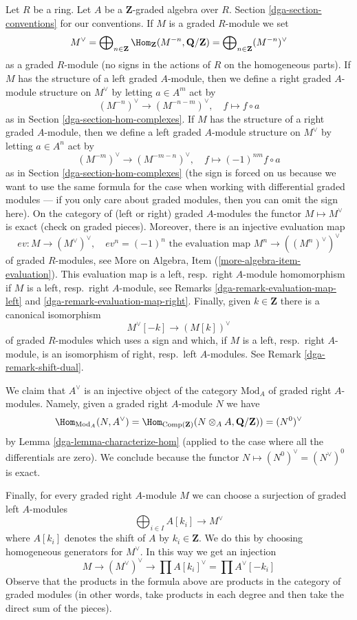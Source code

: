 \medskip\noindent
Let $R$ be a ring. Let $A$ be a $\mathbf{Z}$-graded algebra over $R$.
Section \ref{dga-section-conventions} for our conventions.
If $M$ is a graded $R$-module we set
$$
M^\vee =
\bigoplus\nolimits_{n \in \mathbf{Z}}
\Hom_\mathbf{Z}(M^{-n}, \mathbf{Q}/\mathbf{Z}) =
\bigoplus\nolimits_{n \in \mathbf{Z}} (M^{-n})^\vee
$$
as a graded $R$-module (no signs in the actions of $R$ on the
homogeneous parts). If $M$ has the structure of a left graded
$A$-module, then we define a right graded $A$-module structure
on $M^\vee$ by letting $a \in A^m$ act by
$$
(M^{-n})^\vee \to (M^{-n - m})^\vee, \quad
f \mapsto f \circ a
$$
as in Section \ref{dga-section-hom-complexes}.
If $M$ has the structure of a right graded
$A$-module, then we define a left graded $A$-module structure
on $M^\vee$ by letting $a \in A^n$ act by
$$
(M^{-m})^\vee \to (M^{-m - n})^\vee, \quad
f \mapsto (-1)^{nm}f \circ a
$$
as in Section \ref{dga-section-hom-complexes} (the sign is forced on
us because we want to use the same formula for the case
when working with differential graded modules --- if you only
care about graded modules, then you can omit the sign here).
On the category of (left or right) graded $A$-modules the
functor $M \mapsto M^\vee$ is exact (check on graded pieces).
Moreover, there is an injective evaluation map
$$
ev : M \longrightarrow (M^\vee)^\vee, \quad
ev^n = (-1)^n \text{ the evaluation map }M^n \to ((M^n)^\vee)^\vee
$$
of graded $R$-modules, see
More on Algebra, Item (\ref{more-algebra-item-evaluation}).
This evaluation map is a left, resp.\ right $A$-module homomorphism
if $M$ is a left, resp.\ right $A$-module, see
Remarks \ref{dga-remark-evaluation-map-left} and \ref{dga-remark-evaluation-map-right}.
Finally, given $k \in \mathbf{Z}$ there is a canonical isomorphism
$$
M^\vee[-k] \longrightarrow (M[k])^\vee
$$
of graded $R$-modules which uses a sign and which, if
$M$ is a left, resp.\ right $A$-module, is an isomorphism
of right, resp.\ left $A$-modules. See Remark \ref{dga-remark-shift-dual}.

\medskip\noindent
We claim that $A^\vee$ is an injective object of the category
$\text{Mod}_A$ of graded right $A$-modules. Namely, given a graded
right $A$-module $N$ we have
$$
\Hom_{\text{Mod}_A}(N, A^\vee) =
\Hom_{\text{Comp}(\mathbf{Z})}(N \otimes_A A, \mathbf{Q}/\mathbf{Z})) =
(N^0)^\vee
$$
by Lemma \ref{dga-lemma-characterize-hom}
(applied to the case where all the differentials are zero).
We conclude because the functor $N \mapsto (N^0)^\vee = (N^\vee)^0$
is exact.

\medskip\noindent
Finally, for every graded right $A$-module $M$ we can choose a surjection
of graded left $A$-modules
$$
\bigoplus\nolimits_{i \in I} A[k_i] \to M^\vee
$$
where $A[k_i]$ denotes the shift of $A$ by $k_i \in \mathbf{Z}$.
We do this by choosing homogeneous generators for $M^\vee$.
In this way we get an injection
$$
M \to (M^\vee)^\vee \to \prod A[k_i]^\vee = \prod A^\vee[-k_i]
$$
Observe that the products in the formula above are products in the
category of graded modules (in other words, take products in each degree
and then take the direct sum of the pieces).

